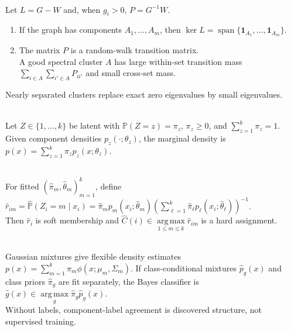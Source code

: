 \begin{remark} \label{rem:sl-spectral-clustering-random-walk-view} \\
Let $L=G-W$ and, when $g_i>0$, $P=G^{-1}W$.
\begin{enumerate}[label=(\roman*)]
\setlength{\itemsep}{0pt}
\item If the graph has components $A_1,\ldots,A_m$, then $\ker L=\operatorname{span}\{\mathbf{1}_{A_1},\ldots,\mathbf{1}_{A_m}\}$.
\item The matrix $P$ is a random-walk transition matrix.\\
A good spectral cluster $A$ has large within-set transition mass $\sum\limits_{i\in A}\sum\limits_{i'\in A}P_{ii'}$ and small cross-set mass.
\end{enumerate}
Nearly separated clusters replace exact zero eigenvalues by small eigenvalues.
\end{remark}

\begin{definition} \label{def:sl-finite-mixture-model} \\
Let $Z\in\{1,\ldots,k\}$ be latent with $\mathbb P(Z=z)=\pi_z$, $\pi_z\geq0$, and $\sum\limits_{z=1}^k\pi_z=1$.\\
Given component densities $p_z(\cdot;\theta_z)$, the marginal density is $p(x)=\sum\limits_{z=1}^k\pi_zp_z(x;\theta_z)$.
\end{definition}

\begin{definition} \label{def:sl-mixture-responsibilities} \\
For fitted $(\widehat{\pi}_m,\widehat{\theta}_m)_{m=1}^k$, define $\widehat r_{im}=\widehat{\mathbb P}(Z_i=m\mid x_i)=\widehat{\pi}_m p_m(x_i;\widehat{\theta}_m)\left(\sum\limits_{\ell=1}^k\widehat{\pi}_\ell p_\ell(x_i;\widehat{\theta}_\ell)\right)^{-1}$.\\
Then $\widehat r_i$ is soft membership and $\widehat C(i)\in\operatorname*{arg\,max}\limits_{1\leq m\leq k}\widehat r_{im}$ is a hard assignment.
\end{definition}

\begin{remark} \label{rem:sl-mixtures-density-classification} \\
Gaussian mixtures give flexible density estimates $p(x)=\sum\limits_{m=1}^k\pi_m\phi(x;\mu_m,\Sigma_m)$. If class-conditional mixtures $\widehat p_g(x)$ and class priors $\widehat\pi_g$ are fit separately, the Bayes classifier is $\widehat g(x)\in\operatorname*{arg\,max}\limits_g\widehat\pi_g\widehat p_g(x)$.\\
Without labels, component-label agreement is discovered structure, not supervised training.
\end{remark}

